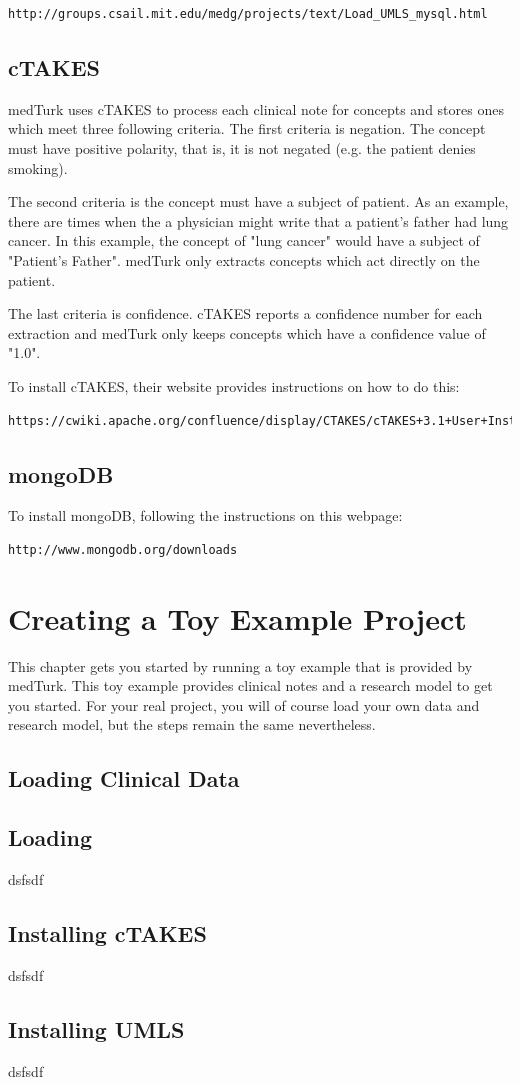 \documentclass{book}
\begin{document}
\begin{verbatim}
http://groups.csail.mit.edu/medg/projects/text/Load_UMLS_mysql.html
\end{verbatim}

\section{cTAKES}
medTurk uses cTAKES to process each clinical note for concepts and stores ones which meet three following criteria. The first criteria is negation. The concept must have positive polarity, that is, it is not negated (e.g. the patient denies smoking).

The second criteria is the concept must have a subject of patient. As an example, there are times when the a physician might write that a patient's father had lung cancer. In this example, the concept of "lung cancer" would have a subject of "Patient's Father". medTurk only extracts concepts which act directly on the patient.

The last criteria is confidence. cTAKES reports a confidence number for each extraction and medTurk only keeps concepts which have a confidence value of "1.0".

To install cTAKES, their website provides instructions on how to do this:

\begin{verbatim}
https://cwiki.apache.org/confluence/display/CTAKES/cTAKES+3.1+User+Install+Guide
\end{verbatim}

\section{mongoDB}
To install mongoDB, following the instructions on this webpage:

\begin{verbatim}
http://www.mongodb.org/downloads
\end{verbatim}


\chapter{Creating a Toy Example Project}
This chapter gets you started by running a toy example that is provided by medTurk. This toy example provides clinical notes and a research model to get you started. For your real project, you will of course load your own data and research model, but the steps remain the same nevertheless.

\section{Loading Clinical Data}

\section{Loading }
dsfsdf

\section{Installing cTAKES}
dsfsdf

\section{Installing UMLS}
dsfsdf
\end{document}
